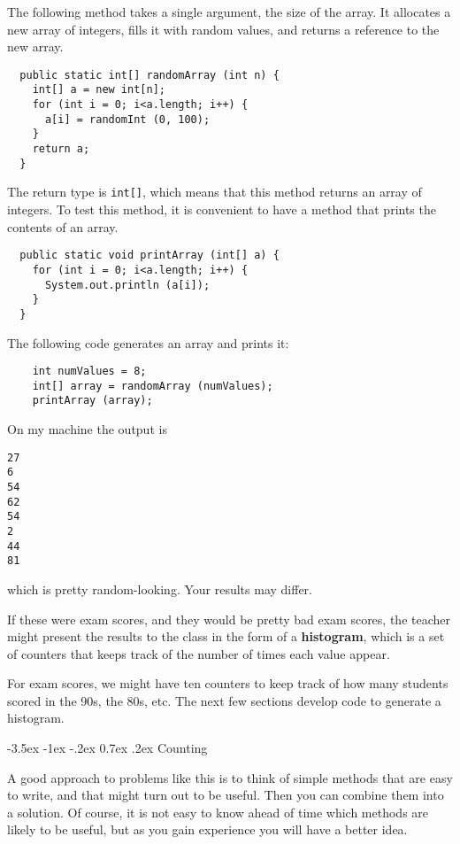 \documentclass{book}
\makeatletter
\renewcommand{\section}{\@startsection 
    {section} {1} {0mm}%
    {-3.5ex \@plus -1ex \@minus -.2ex}%
    {0.7ex \@plus.2ex}%
    {\normalfont\Large\bfseries}}
\makeatother
\begin{document}
The following method takes a single argument, the size of
the array.  It allocates a new array of integers, fills
it with random values, and returns a reference to the new
array.

\begin{verbatim}
  public static int[] randomArray (int n) {
    int[] a = new int[n];
    for (int i = 0; i<a.length; i++) {
      a[i] = randomInt (0, 100);
    }
    return a;
  }
\end{verbatim}
%
The return type is {\tt int[]}, which means that
this method returns an array of integers.
To test this method, it is convenient to have a method that
prints the contents of an array.

\begin{verbatim}
  public static void printArray (int[] a) {
    for (int i = 0; i<a.length; i++) {
      System.out.println (a[i]);
    }
  }
\end{verbatim}
%
The following code generates an array and prints it:

\begin{verbatim}
    int numValues = 8;
    int[] array = randomArray (numValues);
    printArray (array);
\end{verbatim}
%
On my machine the output is

\begin{verbatim}
27
6
54
62
54
2
44
81
\end{verbatim}
%
which is pretty random-looking.  Your results may differ.

If these were exam scores, and they would be pretty bad exam
scores, the teacher might present the results to the class
in the form of a {\bf histogram}, which is a set of counters
that keeps track of the number of times each value appear.


For exam scores, we might have ten counters to keep track of
how many students scored in the 90s, the 80s, etc.  The next
few sections develop code to generate a histogram.


\section{Counting}

A good approach to problems like this is to think of simple methods
that are easy to write, and that might turn out to be useful.  Then
you can combine them into a solution.  Of course, it is not easy to
know ahead of time which methods are likely to be useful, but as you
gain experience you will have a better idea.
\end{document}
